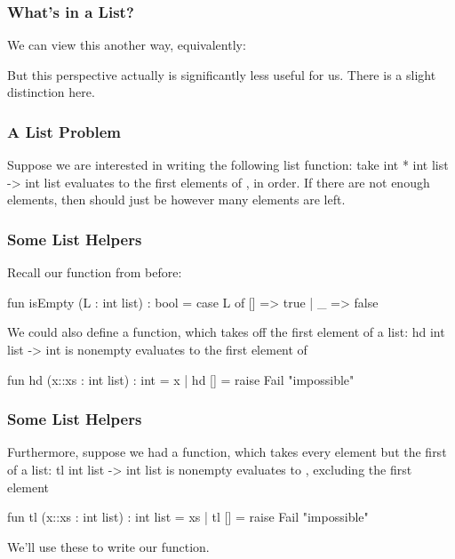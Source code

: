 \documentclass[aspectratio=169]{beamer}
\begin{document}
\begin{frame}[fragile]
  \frametitle{What's in a List?}

  We can view this another way, equivalently:

  \pause
  \vspace{\fill}


  \pause
  \vspace{\fill}

  But this perspective actually is significantly less useful for
  us. There is a slight distinction here.
\end{frame}

\begin{frame}[fragile]
  \frametitle{A List Problem}

  Suppose we are interested in writing the following list function:
  \spec
    {take}
    {int * int list -> int list}
    {}
    { evaluates to the first  elements of ,
    in order. If there are not enough elements, then  should just be
    however many elements are left.}

\end{frame}

\begin{frame}[fragile]
  \frametitle{Some List Helpers}

  Recall our  function from before:
  \begin{codeblock}
    fun isEmpty (L : int list) : bool =
      case L of
        [] => true
      | _ => false
  \end{codeblock}

  \pause
  \vspace{\fill}

  We could also define a  function, which takes off the
  first element of a list:
  \spec
    {hd}
    {int list -> int}
    { is nonempty}
    { evaluates to the first element of }
  \pause
  \begin{codeblock}
    fun hd (x::xs : int list) : int = x
      | hd [] = raise Fail "impossible"
  \end{codeblock}

\end{frame}

\begin{frame}[fragile]
  \frametitle{Some List Helpers}

  Furthermore, suppose we had a  function, which takes
  every element but the first of a list:
  \spec
    {tl}
    {int list -> int list}
    { is nonempty}
    { evaluates to , excluding the first element}
  \pause
  \begin{codeblock}
    fun tl (x::xs : int list) : int list = xs
      | tl [] = raise Fail "impossible"
  \end{codeblock}

  \pause
  \vspace{\fill}

  We'll use these to write our  function.
\end{frame}
\end{document}
